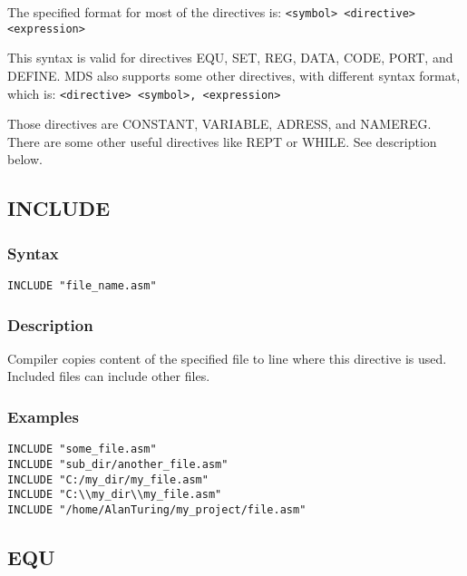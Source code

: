     The specified format for most of the directives is:
    {
        \usecodefont
        \verb'<symbol> <directive> <expression>'
    }

    \bigskip

    This syntax is valid for directives EQU, SET, REG, DATA, CODE, PORT, and DEFINE. MDS also supports some other directives, with different syntax format, which is:
    {
        \usecodefont
        \verb'<directive> <symbol>, <expression>'
    }

    \bigskip

    Those directives are CONSTANT, VARIABLE, ADRESS, and NAMEREG. There are some other useful directives like REPT or WHILE. See description below.

    \clearpage
    \subsection{INCLUDE}
        \subsubsection{Syntax}
            {
                \usecodefont
                \verb'INCLUDE "file_name.asm"'
            }

        \subsubsection{Description}
            Compiler copies content of the specified file to line where this directive is used. Included files can include other files.

        \subsubsection{Examples}
            {
                \usecodefont
                \verb'INCLUDE "some_file.asm"'\\
                \verb'INCLUDE "sub_dir/another_file.asm"'\\
                \verb'INCLUDE "C:/my_dir/my_file.asm"'\\
                \verb'INCLUDE "C:\\my_dir\\my_file.asm"'\\
                \verb'INCLUDE "/home/AlanTuring/my_project/file.asm"'\\
            }

    \subsection{EQU}
